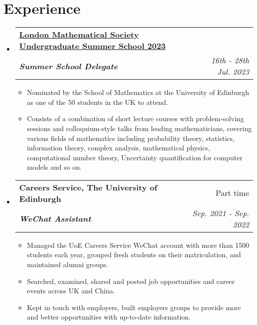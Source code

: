 \documentclass[12pt, a4paper]{article}
\makeatletter
\newcommand{\resumeSection}[1]{
    \section*{#1}
}
\newcommand{\resumeSectionItm}[4]{
\item
    \begin{tabular*}{0.96\textwidth}{@{}l@{\extracolsep{\fill}}r@{}}
        \textbf{#1} & #2 \\
        \textit{\textbf{#3}} & \textit{#4}
    \end{tabular*}
}
\newcommand{\resumeSectionSubItmI}[1]{
\item {#1}\vspace{-2mm}
}
\makeatother
\begin{document}
\resumeSection{Experience}
\begin{itemize}[leftmargin=*]
    \resumeSectionItm{\href{https://www.lms.ac.uk/events/lms-summer-schools}
    {London Mathematical Society Undergraduate Summer School 2023}}
    {}{Summer School Delegate}{16th - 28th Jul. 2023}\vspace{-2mm}
    \begin{itemize}[leftmargin=*]
        \setlength\itemsep{1.5mm}
        \resumeSectionSubItmI{Nominated by the School of Mathematics at the
            University of Edinburgh as one of the 50 students in the UK to
        attend.}
        \resumeSectionSubItmI{Consists of a combination of
            short lecture courses with problem-solving sessions and
            colloquium-style talks from leading mathematicians, covering various
            fields of mathematics including probability theory, statistics,
            information theory, complex analysis, mathematical physics,
            computational number theory, Uncertainty quantification for computer
        models and so on.}
    \end{itemize}\vspace{0mm}
    \resumeSectionItm
    {Careers Service, The University of Edinburgh}{Part time}
    {WeChat Assistant}{Sep. 2021 - Sep. 2022}\vspace{-2mm}
    \begin{itemize}[leftmargin=*]
        \setlength\itemsep{1.5mm}
        \resumeSectionSubItmI{Managed the UoE Careers Service WeChat account
            with more than 1500 students each year, grouped fresh students on
            their matriculation, and maintained alumni groups.}
        \resumeSectionSubItmI{Searched, examined, shared and posted job
        opportunities and career events across UK and China.}
        \resumeSectionSubItmI{Kept in touch with employers, built employers
            groups to provide more and better opportunities with up-to-date
        information.}
    \end{itemize}
\end{itemize}
\vspace{-2mm}
\end{document}
